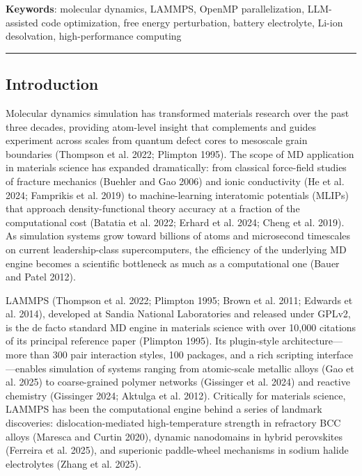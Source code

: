 \documentclass[
  11pt,
]{article}
\begin{document}
\textbf{Keywords}: molecular dynamics, LAMMPS, OpenMP parallelization,
LLM-assisted code optimization, free energy perturbation, battery
electrolyte, Li-ion desolvation, high-performance computing

\begin{center}\rule{0.5\linewidth}{0.5pt}\end{center}

\subsection{Introduction}\label{introduction}

Molecular dynamics simulation has transformed materials research over
the past three decades, providing atom-level insight that complements
and guides experiment across scales from quantum defect cores to
mesoscale grain boundaries ({Thompson et al.} 2022; Plimpton 1995). The
scope of MD application in materials science has expanded dramatically:
from classical force-field studies of fracture mechanics (Buehler and
Gao 2006) and ionic conductivity ({He et al.} 2024; Famprikis et al.
2019) to machine-learning interatomic potentials (MLIPs) that approach
density-functional theory accuracy at a fraction of the computational
cost ({Batatia et al.} 2022; Erhard et al. 2024; Cheng et al. 2019). As
simulation systems grow toward billions of atoms and microsecond
timescales on current leadership-class supercomputers, the efficiency of
the underlying MD engine becomes a scientific bottleneck as much as a
computational one (Bauer and Patel 2012).

LAMMPS ({Thompson et al.} 2022; Plimpton 1995; Brown et al. 2011;
Edwards et al. 2014), developed at Sandia National Laboratories and
released under GPLv2, is the de facto standard MD engine in materials
science with over 10,000 citations of its principal reference paper
(Plimpton 1995). Its plugin-style architecture---more than 300 pair
interaction styles, 100 packages, and a rich scripting
interface---enables simulation of systems ranging from atomic-scale
metallic alloys ({Gao et al.} 2025) to coarse-grained polymer networks
(Gissinger et al. 2024) and reactive chemistry (Gissinger 2024; Aktulga
et al. 2012). Critically for materials science, LAMMPS has been the
computational engine behind a series of landmark discoveries:
dislocation-mediated high-temperature strength in refractory BCC alloys
(Maresca and Curtin 2020), dynamic nanodomains in hybrid perovskites
({Ferreira et al.} 2025), and superionic paddle-wheel mechanisms in
sodium halide electrolytes ({Zhang et al.} 2025).
\end{document}
